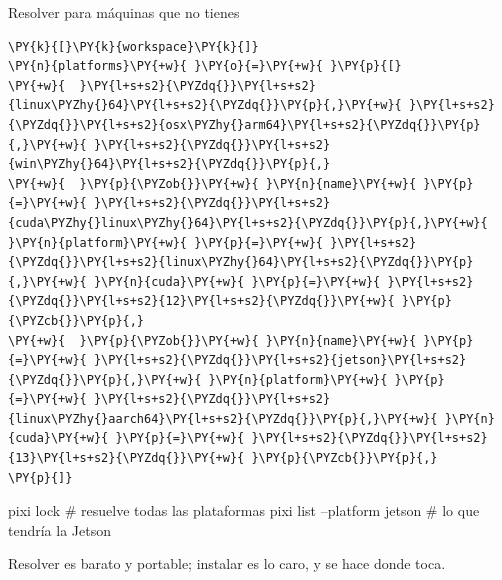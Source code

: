 \documentclass[aspectratio=169]{beamer}
\begin{document}
\begin{frame}[fragile]{Resolver para máquinas que no tienes}
\begin{filelisting}
\begin{Verbatim}[commandchars=\\\{\},breaklines,breakanywhere]
\PY{k}{[}\PY{k}{workspace}\PY{k}{]}
\PY{n}{platforms}\PY{+w}{ }\PY{o}{=}\PY{+w}{ }\PY{p}{[}
\PY{+w}{  }\PY{l+s+s2}{\PYZdq{}}\PY{l+s+s2}{linux\PYZhy{}64}\PY{l+s+s2}{\PYZdq{}}\PY{p}{,}\PY{+w}{ }\PY{l+s+s2}{\PYZdq{}}\PY{l+s+s2}{osx\PYZhy{}arm64}\PY{l+s+s2}{\PYZdq{}}\PY{p}{,}\PY{+w}{ }\PY{l+s+s2}{\PYZdq{}}\PY{l+s+s2}{win\PYZhy{}64}\PY{l+s+s2}{\PYZdq{}}\PY{p}{,}
\PY{+w}{  }\PY{p}{\PYZob{}}\PY{+w}{ }\PY{n}{name}\PY{+w}{ }\PY{p}{=}\PY{+w}{ }\PY{l+s+s2}{\PYZdq{}}\PY{l+s+s2}{cuda\PYZhy{}linux\PYZhy{}64}\PY{l+s+s2}{\PYZdq{}}\PY{p}{,}\PY{+w}{ }\PY{n}{platform}\PY{+w}{ }\PY{p}{=}\PY{+w}{ }\PY{l+s+s2}{\PYZdq{}}\PY{l+s+s2}{linux\PYZhy{}64}\PY{l+s+s2}{\PYZdq{}}\PY{p}{,}\PY{+w}{ }\PY{n}{cuda}\PY{+w}{ }\PY{p}{=}\PY{+w}{ }\PY{l+s+s2}{\PYZdq{}}\PY{l+s+s2}{12}\PY{l+s+s2}{\PYZdq{}}\PY{+w}{ }\PY{p}{\PYZcb{}}\PY{p}{,}
\PY{+w}{  }\PY{p}{\PYZob{}}\PY{+w}{ }\PY{n}{name}\PY{+w}{ }\PY{p}{=}\PY{+w}{ }\PY{l+s+s2}{\PYZdq{}}\PY{l+s+s2}{jetson}\PY{l+s+s2}{\PYZdq{}}\PY{p}{,}\PY{+w}{ }\PY{n}{platform}\PY{+w}{ }\PY{p}{=}\PY{+w}{ }\PY{l+s+s2}{\PYZdq{}}\PY{l+s+s2}{linux\PYZhy{}aarch64}\PY{l+s+s2}{\PYZdq{}}\PY{p}{,}\PY{+w}{ }\PY{n}{cuda}\PY{+w}{ }\PY{p}{=}\PY{+w}{ }\PY{l+s+s2}{\PYZdq{}}\PY{l+s+s2}{13}\PY{l+s+s2}{\PYZdq{}}\PY{+w}{ }\PY{p}{\PYZcb{}}\PY{p}{,}
\PY{p}{]}
\end{Verbatim}
\end{filelisting}
\begin{terminal}
pixi lock                          # resuelve todas las plataformas
pixi list --platform jetson        # lo que tendría la Jetson
\end{terminal}
\vfill
\centering Resolver es barato y portable; instalar es lo caro, y se hace donde toca.
\end{frame}
\end{document}
